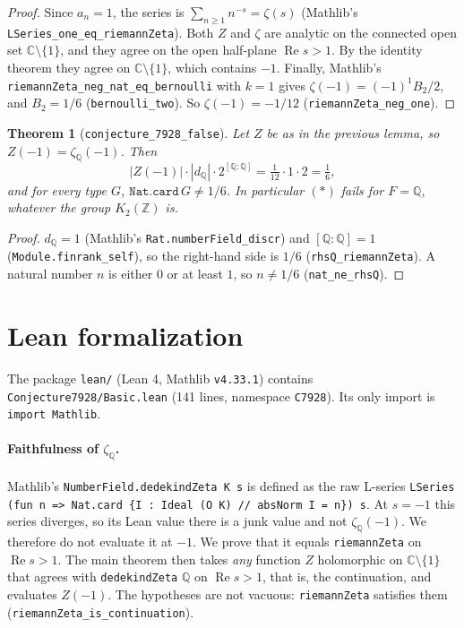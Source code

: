 \documentclass[11pt]{article}
\newtheorem{theorem}{Theorem}
\theoremstyle{remark}
\newcommand{\Q}{\mathbb{Q}}
\newcommand{\Z}{\mathbb{Z}}
\newcommand{\C}{\mathbb{C}}
\begin{document}
\begin{proof}
Since $a_n=1$, the series is $\sum_{n\ge1}n^{-s}=\zeta(s)$ (Mathlib's
\texttt{LSeries\_one\_eq\_riemannZeta}). Both $Z$ and $\zeta$ are analytic on the connected open set
$\C\setminus\{1\}$, and they agree on the open half-plane $\operatorname{Re}s>1$. By the identity
theorem they agree on $\C\setminus\{1\}$, which contains $-1$. Finally, Mathlib's
\texttt{riemannZeta\_neg\_nat\_eq\_bernoulli} with $k=1$ gives
$\zeta(-1) = (-1)^1 B_2/2$, and $B_2 = 1/6$ (\texttt{bernoulli\_two}). So $\zeta(-1) = -1/12$
(\texttt{riemannZeta\_neg\_one}).
\end{proof}

\begin{theorem}[\texttt{conjecture\_7928\_false}]\label{thm:main}
Let $Z$ be as in the previous lemma, so $Z(-1)=\zeta_\Q(-1)$. Then
\[
  |Z(-1)|\cdot|d_\Q|\cdot 2^{[\Q:\Q]} = \tfrac{1}{12}\cdot 1\cdot 2 = \tfrac16,
\]
and for every type $G$, $\texttt{Nat.card}\,G \ne 1/6$. In particular $(\ast)$ fails for $F=\Q$,
whatever the group $K_2(\Z)$ is.
\end{theorem}

\begin{proof}
$d_\Q = 1$ (Mathlib's \texttt{Rat.numberField\_discr}) and $[\Q:\Q]=1$
(\texttt{Module.finrank\_self}), so the right-hand side is $1/6$ (\texttt{rhsQ\_riemannZeta}). A
natural number $n$ is either $0$ or at least $1$, so $n\ne 1/6$ (\texttt{nat\_ne\_rhsQ}).
\end{proof}

\section{Lean formalization}

The package \texttt{lean/} (Lean 4, Mathlib \texttt{v4.33.1}) contains
\texttt{Conjecture7928/Basic.lean} (141 lines, namespace \texttt{C7928}). Its only import is
\texttt{import Mathlib}.

\paragraph{Faithfulness of $\zeta_\Q$.} Mathlib's \texttt{NumberField.dedekindZeta K s} is defined
as the raw L-series \texttt{LSeries (fun n => Nat.card \{I : Ideal (O K) // absNorm I = n\}) s}. At
$s=-1$ this series diverges, so its Lean value there is a junk value and not $\zeta_\Q(-1)$. We
therefore do not evaluate it at $-1$. We prove that it equals \texttt{riemannZeta} on
$\operatorname{Re}s>1$. The main theorem then takes \emph{any} function $Z$ holomorphic on
$\C\setminus\{1\}$ that agrees with \texttt{dedekindZeta} $\Q$ on $\operatorname{Re}s>1$, that is, the
continuation, and evaluates $Z(-1)$. The hypotheses are not vacuous: \texttt{riemannZeta} satisfies
them (\texttt{riemannZeta\_is\_continuation}).
\end{document}
